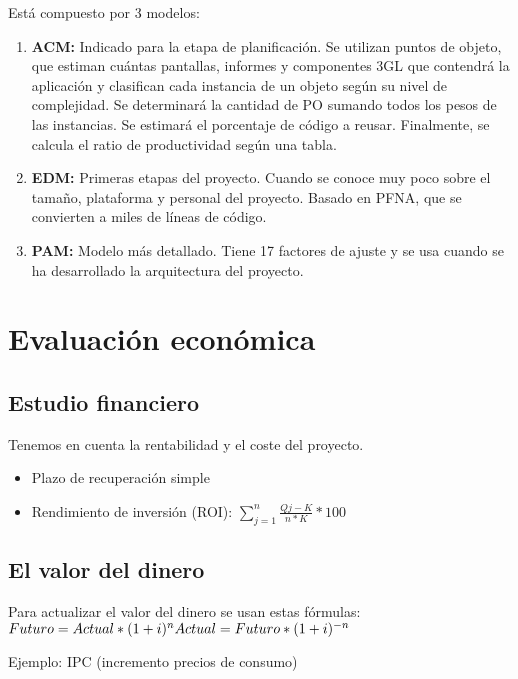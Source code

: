 \documentclass{article}
\begin{document}
\begin{itemize}
	Está compuesto por 3 modelos:
	\begin{enumerate}
		\item \textbf{ACM:} Indicado para la etapa de planificación. Se utilizan puntos de objeto, que estiman cuántas pantallas, informes y componentes 3GL que contendrá la aplicación y clasifican cada instancia de un objeto según su nivel de complejidad. Se determinará la cantidad de PO sumando todos los pesos de las instancias. Se estimará el porcentaje de código a reusar. Finalmente, se calcula el ratio de productividad según una tabla. 
		\item \textbf{EDM:} Primeras etapas del proyecto. Cuando se conoce muy poco sobre el tamaño, plataforma y personal del proyecto. Basado en PFNA, que se convierten a miles de líneas de código.
		\item \textbf{PAM:} Modelo más detallado. Tiene 17 factores de ajuste y se usa cuando se ha desarrollado la arquitectura del proyecto. 
	\end{enumerate}
\end{itemize}

\section{Evaluación económica}
\subsection{Estudio financiero}
Tenemos en cuenta la rentabilidad y el coste del proyecto. 
\begin{itemize}
	\item Plazo de recuperación simple
	\item Rendimiento de inversión (ROI):
	\begin{math}
	\sum_{j=1}^{n} \frac{Qj - K}{n * K}*100
	\end{math}
\end{itemize}

\subsection{El valor del dinero}
Para actualizar el valor del dinero se usan estas fórmulas:\\
\begin{math}
Futuro = Actual * (1+i)^n\\
Actual = Futuro * (1+i)^{-n}
\end{math}

Ejemplo: IPC (incremento precios de consumo)
\end{document}
